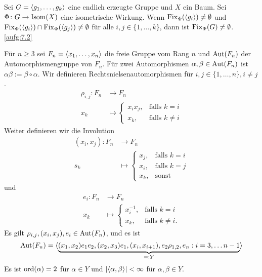 \begin{satz}[Verallgemeinerung]
\label{satz:3.9}
	Sei $G = \langle g_1,\dots,g_k\rangle$ eine endlich erzeugte Gruppe und $X$ ein Baum.
	Sei $\Phi\colon G \rightarrow \operatorname{Isom}(X)$ eine isometrische Wirkung.
	Wenn $\operatorname{Fix}_\Phi(\langle g_i\rangle) \neq \emptyset$ und $\operatorname{Fix}_\Phi(\langle g_i\rangle) \cap \operatorname{Fix}_\Phi(\langle g_j\rangle) \neq \emptyset$ für alle $i,j \in \{1,\dots,k\}$, dann ist $\operatorname{Fix}_\Phi(G) \neq \emptyset$. \autoref{aufg:7.2}
\end{satz}

\begin{no-bsp}
\label{bsp:3.10}
	Für $n \geq 3$ sei $F_n = \langle x_1, \dots, x_n\rangle$ die freie Gruppe vom Rang $n$ und $\operatorname{Aut}(F_n)$ der Automorphismengruppe von $F_n$. 
	Für zwei Automorphismen $\alpha, \beta \in \operatorname{Aut}(F_n)$ ist $\alpha \beta := \beta \circ \alpha$.
	Wir definieren Rechtsnielsenautomorphismen für $i,j \in \{1, \dots, n\}, i \neq j$.
	\begin{align*}
		\rho_{i,j} \colon F_n &\longrightarrow F_n \\
		x_k &\longmapsto \begin{cases}
			x_ix_j, & \text{falls } k=i \\
			x_k, & \text{falls } k \neq i
		\end{cases}
	\end{align*}
	Weiter definieren wir die Involution
	\begin{align*}
		(x_i,x_j)\colon F_n &\longrightarrow F_n \\
			s_k &\longmapsto \begin{cases}
				x_j, & \text{falls } k=i \\
				x_i, & \text{falls } k=j \\
				x_k, & \text{sonst}
			\end{cases}
	\end{align*}
	und
	\begin{align*}
		e_i \colon F_n &\longrightarrow F_n \\
		x_k &\longmapsto \begin{cases}
			x_i^{-1}, & \text{falls } k = i \\
			x_k, &\text{falls } k \neq i.
		\end{cases}
	\end{align*}
	Es gilt $\rho_{i,j}, (x_i,x_j), e_i \in \operatorname{Aut}(F_n)$, und es ist
	\[
		\operatorname{Aut}(F_n) = \langle{\underbrace{(x_1,x_2)e_1e_2, (x_2,x_3)e_1, (x_i,x_{i+1}), e_2\rho_{1,2},e_n : i = 3, \dots n-1}_{=:Y}}\rangle
	\]
	Es ist $\operatorname{ord}(\alpha) = 2$ für $\alpha \in Y$ und $\lvert\langle\alpha,\beta\rangle\rvert < \infty$ für $\alpha,\beta \in Y$.
	

\end{no-bsp}
